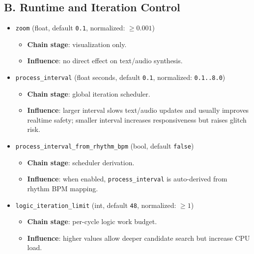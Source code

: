 \documentclass[11pt,a4paper]{article}
\begin{document}
\subsection*{B. Runtime and Iteration Control}
\begin{itemize}
  \item \texttt{zoom} (float, default \texttt{0.1}, normalized: $\ge 0.001$)
  \begin{itemize}
    \item \textbf{Chain stage}: visualization only.
    \item \textbf{Influence}: no direct effect on text/audio synthesis.
  \end{itemize}

  \item \texttt{process\_interval} (float seconds, default \texttt{0.1}, normalized: \texttt{0.1..8.0})
  \begin{itemize}
    \item \textbf{Chain stage}: global iteration scheduler.
    \item \textbf{Influence}: larger interval slows text/audio updates and usually improves realtime safety; smaller interval increases responsiveness but raises glitch risk.
  \end{itemize}

  \item \texttt{process\_interval\_from\_rhythm\_bpm} (bool, default \texttt{false})
  \begin{itemize}
    \item \textbf{Chain stage}: scheduler derivation.
    \item \textbf{Influence}: when enabled, \texttt{process\_interval} is auto-derived from rhythm BPM mapping.
  \end{itemize}

  \item \texttt{logic\_iteration\_limit} (int, default \texttt{48}, normalized: $\ge 1$)
  \begin{itemize}
    \item \textbf{Chain stage}: per-cycle logic work budget.
    \item \textbf{Influence}: higher values allow deeper candidate search but increase CPU load.
  \end{itemize}
\end{itemize}
\end{document}
